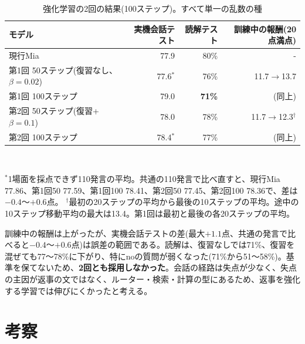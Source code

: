 \documentclass[a4paper,11pt]{article}
\begin{document}
\begin{table}[H]\centering\small
\caption{強化学習の2回の結果(100ステップ)。すべて単一の乱数の種}\label{tab:rl}
\begin{tabular}{lrrr}\toprule
モデル & 実機会話テスト & 読解テスト & 訓練中の報酬(20点満点)\\\midrule
現行Mia & 77.9 & 80\% & -\\
第1回 50ステップ(復習なし、$\beta=0.02$) & 77.6$^*$ & 76\% & 11.7$\rightarrow$13.7\\
第1回 100ステップ & 79.0 & \textbf{71\%} & (同上)\\
第2回 50ステップ(復習+$\beta=0.1$) & 78.0 & 78\% & 11.7$\rightarrow$12.3$^\dagger$\\
第2回 100ステップ & 78.4$^*$ & 77\% & (同上)\\\bottomrule
\end{tabular}\\[1mm]
\parbox{0.88\linewidth}{\scriptsize $^*$1場面を採点できず110発言の平均。共通の110発言で比べ直すと、現行Mia 77.86、第1回50 77.59、第1回100 78.41、第2回50 77.45、第2回100 78.36で、差は$-0.4$〜$+0.6$点。 $^\dagger$最初の20ステップの平均から最後の10ステップの平均。途中の10ステップ移動平均の最大は13.4。第1回は最初と最後の各20ステップの平均。}
\end{table}

訓練中の報酬は上がったが、実機会話テストの差(最大$+1.1$点、共通の発言で比べると$-0.4$〜$+0.6$点)は誤差の範囲である。読解は、復習なしでは71\%、復習を混ぜても77〜78\%に下がり、特にnoの質問が弱くなった(71\%から51〜58\%)。基準を保てないため、\textbf{2回とも採用しなかった}。会話の経路は失点が少なく、失点の主因が返事の文ではなく、ルーター・検索・計算の型にあるため、返事を強化する学習では伸びにくかったと考える。

\section{考察}\label{sec:limits}
\end{document}
